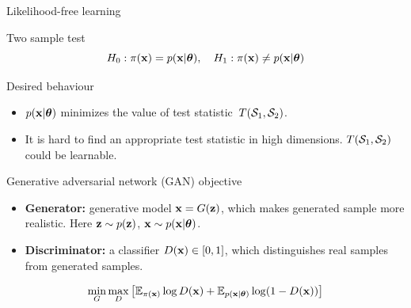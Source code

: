 \documentclass{beamer}
\begin{document}
\begin{frame}{Likelihood-free learning}
	\begin{block}{Two sample test}
		\vspace{-0.5cm}
		\[
			H_0: \pi(\mathbf{x}) = p(\mathbf{x} | \boldsymbol{\theta}), \quad H_1: \pi(\mathbf{x}) \neq p(\mathbf{x} | \boldsymbol{\theta})
		\]
		\vspace{-0.8cm}
	\end{block}
	\begin{block}{Desired behaviour}
		\begin{itemize}
			\item $p(\mathbf{x} | \boldsymbol{\theta})$ minimizes the value of test statistic~$T(\mathcal{S}_1, \mathcal{S}_2)$.
			\item It is hard to find an appropriate test statistic in high dimensions. $T(\mathcal{S}_1, \mathcal{S}_2)$ could be learnable.
		\end{itemize}
	\end{block}
	\vspace{-0.3cm}
	\begin{block}{Generative adversarial network (GAN) objective}
		\begin{itemize}
			\item \textbf{Generator:} generative model $\mathbf{x} = G(\mathbf{z})$, which makes generated sample more realistic. Here $\mathbf{z} \sim p(\mathbf{z})$, $\mathbf{x} \sim p(\mathbf{x} | \boldsymbol{\theta})$.
			\item \textbf{Discriminator:} a classifier $D(\mathbf{x}) \in [0, 1]$, which distinguishes real samples from generated samples.
		\end{itemize}
		\[
			\min_{G} \max_D \left[ \mathbb{E}_{\pi(\mathbf{x})} \log D(\mathbf{x}) + \mathbb{E}_{p(\mathbf{x} | \boldsymbol{\theta})} \log (1 - D(\mathbf{x})) \right]
		\]
	\end{block}
\end{frame}
\end{document}
